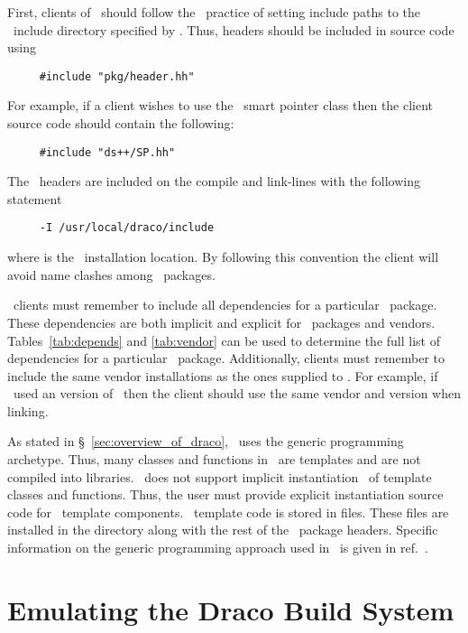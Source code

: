 First, clients of \draco\ should follow the \draco\ practice of
setting include paths to the \draco\ include directory specified by
.  Thus, headers should be included in source code
using
\begin{verbatim}
     #include "pkg/header.hh"
\end{verbatim}
For example, if a client wishes to use the \dsxx\ smart pointer class
then the client source code should contain the following:
\begin{verbatim}
     #include "ds++/SP.hh"
\end{verbatim}
The \draco\ headers are included on the compile and link-lines with
the following statement
\begin{verbatim}
     -I /usr/local/draco/include
\end{verbatim}
where  is the \draco\ installation location.
By following this convention the client will avoid name clashes among
\draco\ packages.

\draco\ clients must remember to include all dependencies for a
particular \draco\ package.  These dependencies are both implicit and
explicit for \draco\ packages and vendors.  Tables~\ref{tab:depends}
and \ref{tab:vendor} can be used to determine the full list of
dependencies for a particular \draco\ package.  Additionally, clients
must remember to include the same vendor installations as the ones
supplied to \draco.  For example, if \draco\ used an 
version of \mpi\ then the client should use the same vendor and
version when linking.

As stated in \S~\ref{sec:overview_of_draco}, \draco\ uses the generic
programming archetype.  Thus, many classes and functions in \draco\ 
are templates and are not compiled into libraries.  \draco\ does not
support implicit instantiation~\cite{ansi:cpp} of template classes and
functions.  Thus, the user must provide explicit instantiation source
code for \draco\ template components.  \draco\ template code is stored
in \comp{.t.hh} files.  These files are installed in the
 directory along with the rest of the \draco\ package
headers. Specific information on the generic programming approach used in 
\draco\ is given in ref.~\cite{ro98}.


\section{Emulating the Draco Build System}
\label{sec:emulating}

